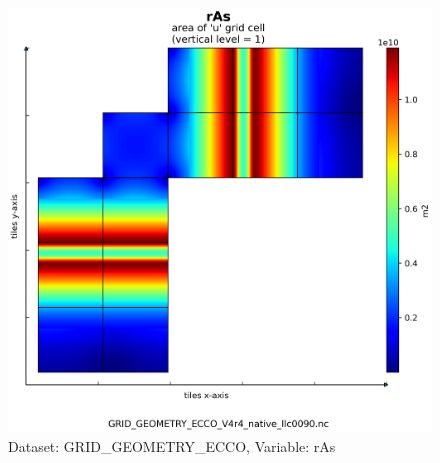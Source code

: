 \begin{figure}[H]
\centering
\includegraphics[scale=0.55]{../images/plots/native_plots_coords/Geometry_Parameters_for_the_Lat-Lon-Cap_90_(llc90)_Native_Model_Grid_(Version_4_Release_4)/rAs.png}
\caption{Dataset: GRID\_GEOMETRY\_ECCO, Variable: rAs}
\label{tab:table-GRID_GEOMETRY_ECCO_rAs-Plot}
\end{figure}
\newpage
\pagebreak
